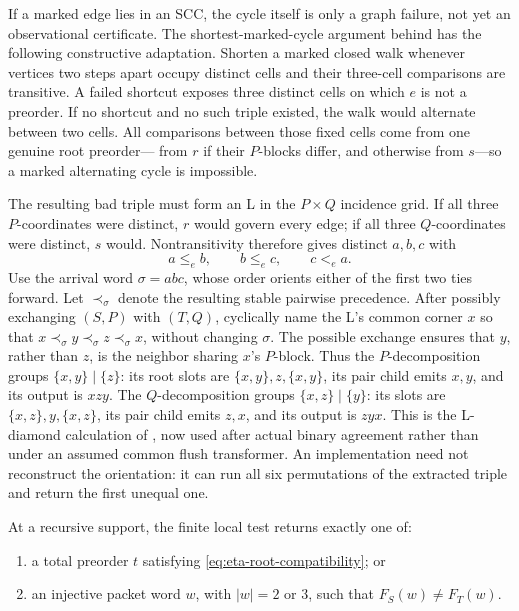 If a marked edge lies in an SCC, the cycle itself is only a graph failure, not
yet an observational certificate.  The shortest-marked-cycle argument behind
 has the following constructive adaptation.  Shorten
a marked closed walk whenever vertices two steps apart occupy distinct cells
and their three-cell comparisons are transitive.  A failed shortcut exposes
three distinct cells on which \(e\) is not a preorder.  If no shortcut and no
such triple existed, the walk would alternate between two cells.  All
comparisons between those fixed cells come from one genuine root preorder---
from \(r\) if their \(P\)-blocks differ, and otherwise from \(s\)---so a
marked alternating cycle is impossible.

The resulting bad triple must form an L in the \(P\times Q\) incidence grid.
If all three \(P\)-coordinates were distinct, \(r\) would govern every edge;
if all three \(Q\)-coordinates were distinct, \(s\) would.  Nontransitivity
therefore gives distinct \(a,b,c\) with
\begin{equation}
  a\le_e b,\qquad b\le_e c,\qquad c<_e a.
 \label{eq:eta-bad-triple}
\end{equation}
Use the arrival word \(\sigma=abc\), whose order orients either of the first
two ties forward.  Let \(\prec_\sigma\) denote the resulting stable pairwise
precedence.  After possibly exchanging \((S,P)\) with \((T,Q)\), cyclically
name the L's common corner \(x\) so that
\(x\prec_\sigma y\prec_\sigma z\prec_\sigma x\), without changing
\(\sigma\).  The possible exchange ensures that \(y\), rather than \(z\), is
the neighbor sharing \(x\)'s \(P\)-block.  Thus the \(P\)-decomposition groups
\(\{x,y\}\mid\{z\}\): its root slots are
\(\{x,y\},z,\{x,y\}\), its pair child emits \(x,y\), and its output is
\(xzy\).  The \(Q\)-decomposition groups
\(\{x,z\}\mid\{y\}\): its slots are
\(\{x,z\},y,\{x,z\}\), its pair child emits \(z,x\), and its output is
\(zyx\).  This is the L-diamond calculation of , now used
after actual binary agreement rather than under an assumed common flush
transformer.  An implementation need not reconstruct the orientation: it can
run all six permutations of the extracted triple and return the first unequal
one.

\begin{lemma}
\label{lem:eta-local-alternative}
At a recursive support, the finite local test returns exactly one of:
\begin{enumerate}
\item a total preorder \(t\) satisfying
      \autoref{eq:eta-root-compatibility}; or
\item an injective packet word \(w\), with \(|w|=2\) or \(3\), such that
      \(F_S(w)\ne F_T(w)\).
\end{enumerate}
\end{lemma}

